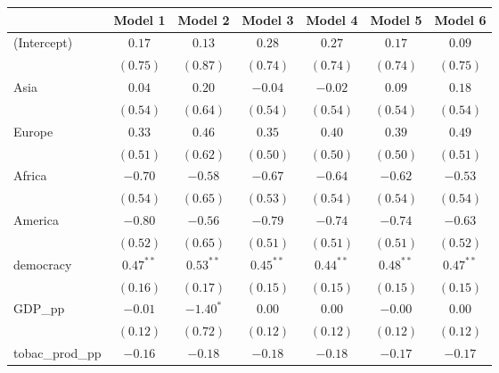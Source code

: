 
\begin{table}[!h]
\begin{center}
\begin{tabular}{l c c c c c c }
\toprule
 & Model 1 & Model 2 & Model 3 & Model 4 & Model 5 & Model 6 \\
\midrule
(Intercept)             & $0.17$       & $0.13$      & $0.28$       & $0.27$       & $0.17$       & $0.09$       \\
                        & $(0.75)$     & $(0.87)$    & $(0.74)$     & $(0.74)$     & $(0.74)$     & $(0.75)$     \\
Asia                    & $0.04$       & $0.20$      & $-0.04$      & $-0.02$      & $0.09$       & $0.18$       \\
                        & $(0.54)$     & $(0.64)$    & $(0.54)$     & $(0.54)$     & $(0.54)$     & $(0.54)$     \\
Europe                  & $0.33$       & $0.46$      & $0.35$       & $0.40$       & $0.39$       & $0.49$       \\
                        & $(0.51)$     & $(0.62)$    & $(0.50)$     & $(0.50)$     & $(0.50)$     & $(0.51)$     \\
Africa                  & $-0.70$      & $-0.58$     & $-0.67$      & $-0.64$      & $-0.62$      & $-0.53$      \\
                        & $(0.54)$     & $(0.65)$    & $(0.53)$     & $(0.54)$     & $(0.54)$     & $(0.54)$     \\
America                 & $-0.80$      & $-0.56$     & $-0.79$      & $-0.74$      & $-0.74$      & $-0.63$      \\
                        & $(0.52)$     & $(0.65)$    & $(0.51)$     & $(0.51)$     & $(0.51)$     & $(0.52)$     \\
democracy               & $0.47^{**}$  & $0.53^{**}$ & $0.45^{**}$  & $0.44^{**}$  & $0.48^{**}$  & $0.47^{**}$  \\
                        & $(0.16)$     & $(0.17)$    & $(0.15)$     & $(0.15)$     & $(0.15)$     & $(0.15)$     \\
GDP\_pp                 & $-0.01$      & $-1.40^{*}$ & $0.00$       & $0.00$       & $-0.00$      & $0.00$       \\
                        & $(0.12)$     & $(0.72)$    & $(0.12)$     & $(0.12)$     & $(0.12)$     & $(0.12)$     \\
tobac\_prod\_pp         & $-0.16$      & $-0.18$     & $-0.18$      & $-0.18$      & $-0.17$      & $-0.17$      \\

\end{tabular}
\end{center}
\end{table}
